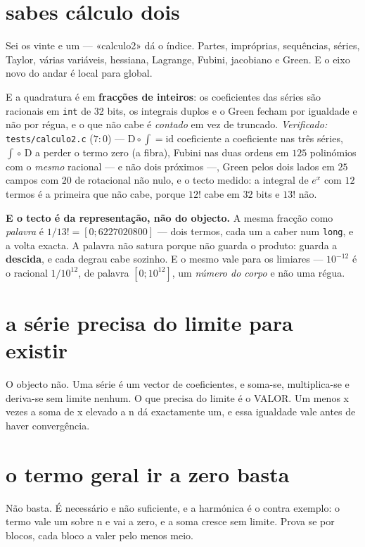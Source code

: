 \documentclass[11pt,a4paper]{article}
\newcommand{\code}[1]{\texttt{\small #1}}
\begin{document}
\section{sabes cálculo dois}
Sei os vinte e um — «calculo2» dá o índice. Partes, impróprias, sequências, séries,
Taylor, várias variáveis, hessiana, Lagrange, Fubini, jacobiano e Green. E o eixo novo
do andar é local para global.

E a quadratura é em \textbf{fracções de inteiros}: os coeficientes das séries são
racionais em \code{int} de 32 bits, os integrais duplos e o Green fecham por igualdade e
não por régua, e o que não cabe é \emph{contado} em vez de truncado. \emph{Verificado:}
\code{tests/calculo2.c} ($7{:}0$) --- $\mathrm{D}\!\circ\!\int = \mathrm{id}$ coeficiente a
coeficiente nas três séries, $\int\!\circ\,\mathrm{D}$ a perder o termo zero (a fibra), Fubini
nas duas ordens em $125$ polinómios com o \emph{mesmo} racional --- e não dois próximos ---,
Green pelos dois lados em $25$ campos com $20$ de rotacional não nulo, e o tecto medido: a
integral de $e^x$ com $12$ termos é a primeira que não cabe, porque $12!$ cabe em $32$ bits
e $13!$ não.

\textbf{E o tecto é da representação, não do objecto.} A mesma fracção como \emph{palavra}
é $1/13! = [0;6227020800]$ --- dois termos, cada um a caber num \code{long}, e a volta
exacta. A palavra não satura porque não guarda o produto: guarda a \textbf{descida}, e cada
degrau cabe sozinho. E o mesmo vale para os limiares --- $10^{-12}$ é o racional $1/10^{12}$,
de palavra $[0;10^{12}]$, um \emph{número do corpo} e não uma régua.

\section{a série precisa do limite para existir}
O objecto não. Uma série é um vector de coeficientes, e soma-se, multiplica-se e
deriva-se sem limite nenhum. O que precisa do limite é o VALOR. Um menos x vezes a soma
de x elevado a n dá exactamente um, e essa igualdade vale antes de haver convergência.

\section{o termo geral ir a zero basta}
Não basta. É necessário e não suficiente, e a harmónica é o contra exemplo: o termo vale
um sobre n e vai a zero, e a soma cresce sem limite. Prova se por blocos, cada bloco a
valer pelo menos meio.
\end{document}
